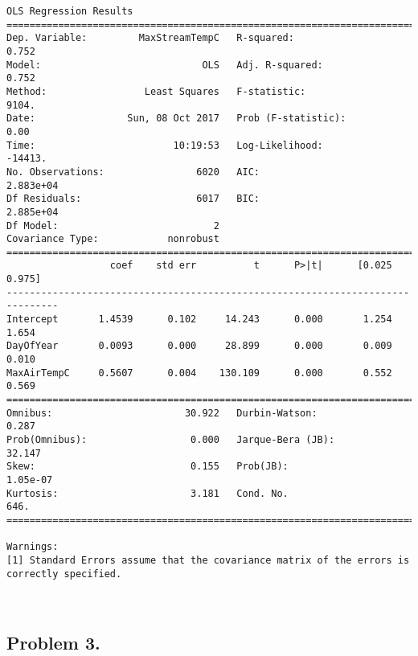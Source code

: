 \documentclass[11pt]{article}
\begin{document}
    \begin{Verbatim}[commandchars=\\\{\}]
                            OLS Regression Results                            
==============================================================================
Dep. Variable:         MaxStreamTempC   R-squared:                       0.752
Model:                            OLS   Adj. R-squared:                  0.752
Method:                 Least Squares   F-statistic:                     9104.
Date:                Sun, 08 Oct 2017   Prob (F-statistic):               0.00
Time:                        10:19:53   Log-Likelihood:                -14413.
No. Observations:                6020   AIC:                         2.883e+04
Df Residuals:                    6017   BIC:                         2.885e+04
Df Model:                           2                                         
Covariance Type:            nonrobust                                         
===============================================================================
                  coef    std err          t      P>|t|      [0.025      0.975]
-------------------------------------------------------------------------------
Intercept       1.4539      0.102     14.243      0.000       1.254       1.654
DayOfYear       0.0093      0.000     28.899      0.000       0.009       0.010
MaxAirTempC     0.5607      0.004    130.109      0.000       0.552       0.569
==============================================================================
Omnibus:                       30.922   Durbin-Watson:                   0.287
Prob(Omnibus):                  0.000   Jarque-Bera (JB):               32.147
Skew:                           0.155   Prob(JB):                     1.05e-07
Kurtosis:                       3.181   Cond. No.                         646.
==============================================================================

Warnings:
[1] Standard Errors assume that the covariance matrix of the errors is correctly specified.

    \end{Verbatim}

    \begin{center}
    \end{center}
    { \hspace*{\fill} \\}
    
    \subsection{Problem 3.}\label{problem-3.}
\end{document}
